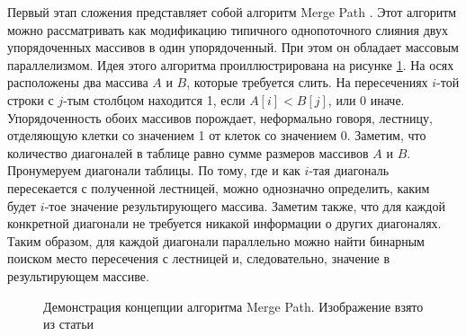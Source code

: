\documentclass[14pt]{matmex-diploma-custom}
\begin{document}
Первый этап сложения представляет собой алгоритм Merge Path \cite{OdedGreen}. Этот алгоритм можно рассматривать как модификацию типичного однопоточного слияния двух упорядоченных массивов в один упорядоченный. При этом он обладает массовым параллелизмом. Идея этого алгоритма проиллюстрирована на рисунке \ref{merge_path}. На осях расположены два массива \(A\) и \(B\), которые требуется слить. На пересечениях \(i\)-той строки с \(j\)-тым столбцом находится 1, если \(A[i] < B[j]\), или 0 иначе. Упорядоченность обоих массивов порождает, неформально говоря, лестницу, отделяющую клетки со значением 1 от клеток со значением 0. Заметим, что количество диагоналей в таблице равно сумме размеров массивов \(A\) и \(B\). Пронумеруем диагонали таблицы. По тому, где и как \(i\)-тая диагональ пересекается с полученной лестницей, можно однозначно определить, каким будет \(i\)-тое значение результирующего массива. Заметим также, что для каждой конкретной диагонали не требуется никакой информации о других диагоналях. Таким образом, для каждой диагонали параллельно можно найти бинарным поиском место пересечения с лестницей и, следовательно, значение в результирующем массиве.

\begin{figure}[h]
\caption{Демонстрация концепции алгоритма Merge Path. Изображение взято из статьи \cite{OdedGreen}}
\label{merge_path}
\end{figure}
\end{document}
